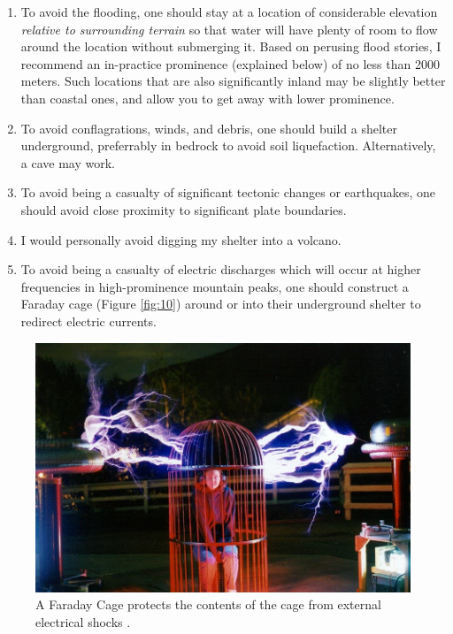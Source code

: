 \documentclass[10pt,twocolumn,letterpaper]{article}
\begin{document}
\begin{flushleft}
\begin{enumerate}
    \item To avoid the flooding, one should stay at a location of considerable elevation \textit{relative to surrounding terrain} so that water will have plenty of room to flow around the location without submerging it. Based on perusing flood stories, I recommend an in-practice prominence (explained below) of no less than 2000 meters. Such locations that are also significantly inland may be slightly better than coastal ones, and allow you to get away with lower prominence.
    \item To avoid conflagrations, winds, and debris, one should build a shelter underground, preferrably in bedrock to avoid soil liquefaction. Alternatively, a cave may work.
    \item To avoid being a casualty of significant tectonic changes or earthquakes, one should avoid close proximity to significant plate boundaries.
    \item I would personally avoid digging my shelter into a volcano.
    \item To avoid being a casualty of electric discharges which will occur at higher frequencies in high-prominence mountain peaks, one should construct a Faraday cage (Figure \ref{fig:10}) around or into their underground shelter to redirect electric currents.
\end{enumerate}
\end{flushleft}

\begin{figure}[t]
\begin{center}
   \includegraphics[width=1\linewidth]{faraday.jpg}
\end{center}
   \caption{A Faraday Cage protects the contents of the cage from external electrical shocks \cite{54}.}
\label{fig:10}
\label{fig:onecol}
\end{figure}
\end{document}
